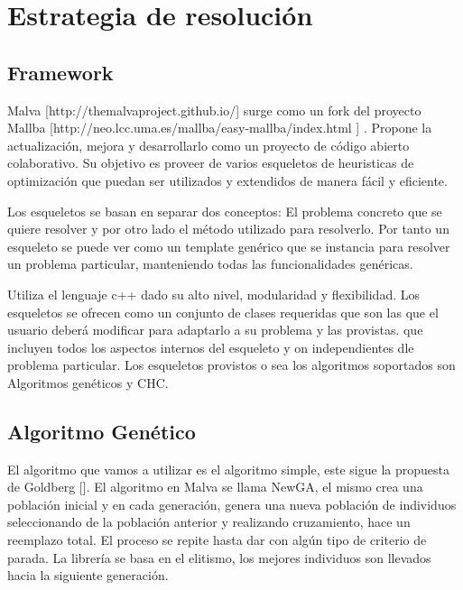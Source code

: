 \chapter{Estrategia de resolución}


\section{Framework}

Malva [http://themalvaproject.github.io/] surge como un fork del proyecto Mallba [http://neo.lcc.uma.es/mallba/easy-mallba/index.html ] . Propone la actualización, mejora y desarrollarlo como un proyecto de código abierto colaborativo.  Su objetivo es proveer de varios esqueletos de heuristicas de optimización que puedan ser utilizados y extendidos de manera fácil y eficiente.

Los esqueletos se basan en separar dos conceptos: El problema concreto que se quiere resolver y por otro lado el método utilizado para resolverlo. Por tanto un esqueleto se puede ver como un template genérico que se instancia para resolver un problema particular, manteniendo todas las funcionalidades genéricas.

Utiliza el lenguaje c++ dado su alto nivel, modularidad y flexibilidad. Los esqueletos se ofrecen como un conjunto de clases requeridas que son las que el usuario deberá modificar para adaptarlo a su problema y las provistas. que incluyen todos los aspectos internos del esqueleto y on independientes dle problema particular.
Los esqueletos provistos o sea los algoritmos soportados son Algoritmos genéticos y CHC.




\section{Algoritmo Genético}
El algoritmo que vamos a utilizar es el algoritmo simple, este
sigue  la  propuesta  de  Goldberg  [].  El  algoritmo  en  Malva  se
llama NewGA, el mismo crea una población inicial y en
cada  generación,  genera  una  nueva  población  de  individuos
seleccionando  de  la  población  anterior  y  realizando
cruzamiento,  hace  un  reemplazo  total.  El  proceso  se  repite
hasta  dar  con  algún  tipo  de  criterio  de parada.  La  librería se
basa en el elitismo, los mejores individuos son llevados hacia
la siguiente generación.

